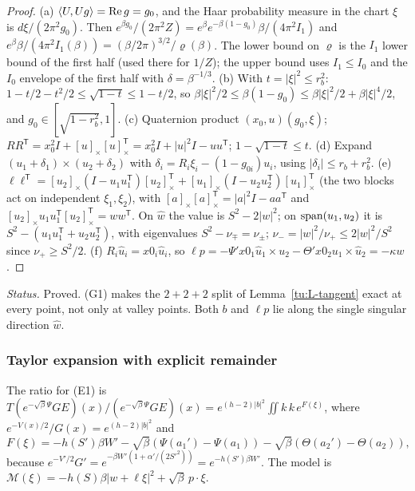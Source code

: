 \begin{proof}
(a) $\langle U,Ug\rangle={\rm Re}\,g=g_0$, and the Haar probability measure in the chart $\xi$ is
$d\xi/(2\pi^2g_0)$. Then $e^{\beta g_0}/(2\pi^2Z)=e^\beta e^{-\beta(1-g_0)}\beta/(4\pi^2I_1)$ and
$e^\beta\beta/(4\pi^2I_1(\beta))=(\beta/2\pi)^{3/2}/\varrho(\beta)$. The lower bound on $\varrho$ is the
$I_1$ lower bound of the first half (used there for $1/Z$); the upper bound uses $I_1\le I_0$ and the
$I_0$ envelope of the first half with $\delta=\beta^{-1/3}$.
(b) With $t=|\xi|^2\le r_b^2$: $1-t/2-t^2/2\le\sqrt{1-t}\le1-t/2$, so
$\beta|\xi|^2/2\le\beta(1-g_0)\le\beta|\xi|^2/2+\beta|\xi|^4/2$, and $g_0\in[\sqrt{1-r_b^2},1]$.
(c) Quaternion product $(x_0,u)(g_0,\xi)$; $RR^{\mathsf T}=x_0^2I+[u]_\times[u]_\times^{\mathsf T}=x_0^2I+|u|^2I-uu^{\mathsf T}$;
$1-\sqrt{1-t}\le t$.
(d) Expand $(u_1+\delta_1)\times(u_2+\delta_2)$ with $\delta_i=R_i\xi_i-(1-g_{0i})u_i$, using $|\delta_i|\le r_b+r_b^2$.
(e) $\ell\ell^{\mathsf T}=[u_2]_\times(I-u_1u_1^{\mathsf T})[u_2]_\times^{\mathsf T}+[u_1]_\times(I-u_2u_2^{\mathsf T})[u_1]_\times^{\mathsf T}$
(the two blocks act on independent $\xi_1,\xi_2$), with $[a]_\times[a]_\times^{\mathsf T}=|a|^2I-aa^{\mathsf T}$ and
$[u_2]_\times u_1u_1^{\mathsf T}[u_2]_\times^{\mathsf T}=ww^{\mathsf T}$. On $\hat w$ the value is $S^2-2|w|^2$; on
${\rm span}(u_1,u_2)$ it is $S^2-(u_1u_1^{\mathsf T}+u_2u_2^{\mathsf T})$, with eigenvalues $S^2-\nu_\mp=\nu_\pm$;
$\nu_-=|w|^2/\nu_+\le2|w|^2/S^2$ since $\nu_+\ge S^2/2$.
(f) $R_i\hat u_i=x0_i\hat u_i$, so $\ell p=-\Psi'x0_1\hat u_1\times u_2-\Theta'x0_2u_1\times\hat u_2=-\kappa w$.
\end{proof}

\noindent\emph{Status.} Proved. (G1) makes the $2+2+2$ split of Lemma~\ref{tu:L-tangent} exact at every
point, not only at valley points. Both $b$ and $\ell p$ lie along the single singular direction $\hat w$.

\subsubsection*{Taylor expansion with explicit remainder}

The ratio for (E1) is
$T(e^{-\sqrt\beta\Psi}GE)(x)/(e^{-\sqrt\beta\Psi}GE)(x)=e^{(h-2)|b|^2}\iint k\,k\,e^{F(\xi)}$, where
$e^{-V(x)/2}/G(x)=e^{(h-2)|b|^2}$ and
\[
F(\xi)=-h(S')\beta W'-\sqrt\beta(\Psi(a_1')-\Psi(a_1))-\sqrt\beta(\Theta(a_2')-\Theta(a_2)),
\]
because $e^{-V'/2}G'=e^{-\beta W'(1+\alpha'/(2S'^2))}=e^{-h(S')\beta W'}$. The model is
$\mathcal M(\xi)=-h(S)\beta|w+\ell\xi|^2+\sqrt\beta\,p\cdot\xi$.

